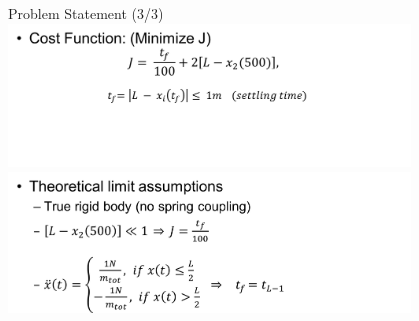 \documentclass[]{beamer}
\begin{document}
\begin{frame}{Problem Statement (3/3)}
    \centering
    \includegraphics[width=0.8\textwidth]{media/image13}\\
    \includegraphics[width=0.8\textwidth]{media/image14}
\end{frame}
\end{document}
